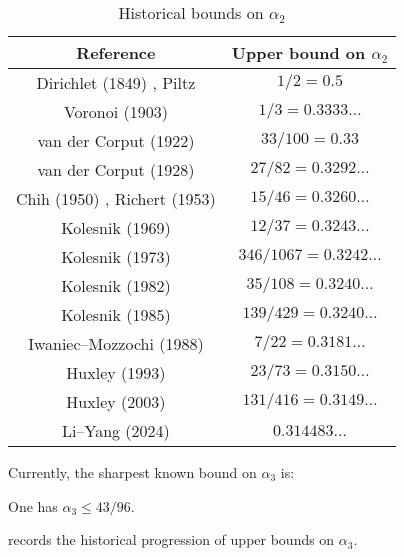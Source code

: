 \begin{table}[ht]
    \def\arraystretch{1.2}
    \centering
    \caption{Historical bounds on $\alpha_2$}
    \begin{tabular}{|c|c|}
    \hline
    Reference & Upper bound on $\alpha_2$\\
    \hline
    Dirichlet (1849) \cite{}, Piltz \cite{} & $1/2 = 0.5$\\
    \hline
    Voronoi (1903) \cite{voronoi_sur_1903} & $1/3 = 0.3333\ldots$\\
    \hline
    van der Corput (1922) \cite{van_der_corput_verscharfung_1922} & $33/100 = 0.33$\\
    \hline
    van der Corput (1928) \cite{van_der_corput_zum_1928} & $27/82 = 0.3292\ldots$\\
    \hline 
    Chih (1950) \cite{chih_on_1950}, Richert (1953) \cite{richert_verschrfung_1953} & $15/46 = 0.3260\ldots$\\
    \hline 
    Kolesnik (1969) \cite{kolesnik_improvement_1969} & $12/37 = 0.3243\ldots$\\
    \hline 
    Kolesnik (1973) \cite{kolesnik_1973} & $346/1067 = 0.3242\ldots$\\
    \hline 
    Kolesnik (1982) \cite{kolesnik_order_1982} & $35/108 = 0.3240\ldots$\\
    \hline 
    Kolesnik (1985) \cite[p. 118]{kolesnik_1985} & $139/429 = 0.3240\ldots$\\
    \hline
    Iwaniec--Mozzochi (1988) \cite{iwaniec_divisor_1988} & $7/22 = 0.3181\ldots$\\
    \hline
    Huxley (1993) \cite{huxley_exponential_1993} & $23/73 = 0.3150\ldots$\\
    \hline
    Huxley (2003) \cite{huxley_exponential_2003} & $131/416 = 0.3149\ldots$\\
    \hline 
    Li--Yang (2024) \cite{li_yang_gauss_2024} & $0.314483\ldots$\\
    \hline 
    \end{tabular}
\label{div-alpha2-table}
\end{table}

Currently, the sharpest known bound on $\alpha_3$ is:

\begin{theorem}\label{divisor-kolesnik}\cite{kolesnik} One has $\alpha_3 \leq 43/96$.
\end{theorem}

 records the historical progression of upper bounds on $\alpha_3$.

